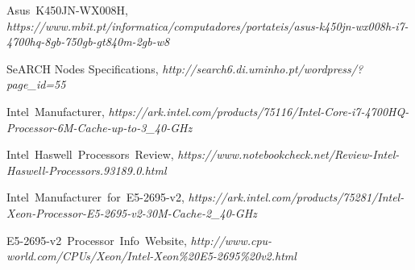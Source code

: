 Asus~K450JN-WX008H,
\emph{https://www.mbit.pt/informatica/computadores/portateis/asus-k450jn-wx008h-i7-4700hq-8gb-750gb-gt840m-2gb-w8 }


SeARCH Nodes Specifications,
\emph{http://search6.di.uminho.pt/wordpress/?page_id=55 }


Intel~Manufacturer,
\emph{https://ark.intel.com/products/75116/Intel-Core-i7-4700HQ-Processor-6M-Cache-up-to-3_40-GHz }


Intel~Haswell~Processors~Review, 
\emph{https://www.notebookcheck.net/Review-Intel-Haswell-Processors.93189.0.html }


Intel~Manufacturer~for~E5-2695-v2, 
\emph{ https://ark.intel.com/products/75281/Intel-Xeon-Processor-E5-2695-v2-30M-Cache-2_40-GHz}

E5-2695-v2~Processor~Info~Website, 
\emph{http://www.cpu-world.com/CPUs/Xeon/Intel-Xeon\%20E5-2695\%20v2.html}

